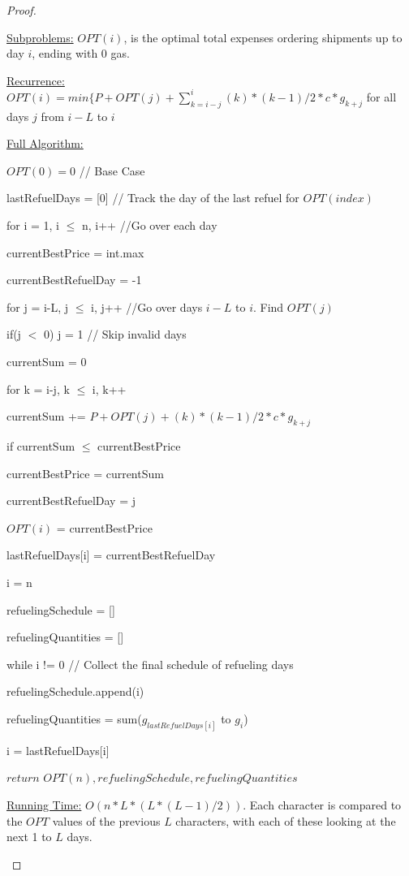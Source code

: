\documentclass[11pt, oneside]{article}   	%
\begin{document}
\begin{proof}
\begin{description}

\underline{Subproblems:} $OPT(i)$, is the optimal total expenses ordering shipments up to day $i$, ending with 0 gas.

\underline{Recurrence:} $OPT(i) = min \{P + OPT(j) + \sum_{k=i-j}^{i}(k)*(k-1)/2*c*g_{k+j}$ for all days $j$ from $i-L$ to $i$


\underline{Full Algorithm:}

$OPT(0) = 0$    \quad // Base Case

lastRefuelDays = [0]  \quad // Track the day of the last refuel for $OPT(index)$

for i = 1, i $\leq$ n, i++  \quad //Go over each day

	\quad currentBestPrice = int.max
	
	\quad currentBestRefuelDay = -1

	\quad for j = i-L, j $\leq$ i, j++  \quad //Go over days $i-L$ to $i$. Find $OPT(j)$

	\quad \quad if(j $<$ 0) j = 1 \quad // Skip invalid days
	
	\quad \quad currentSum = 0
	
	\quad \quad for k = i-j, k $\leq$ i, k++

	\quad \quad \quad currentSum += $P + OPT(j) + (k)*(k-1)/2*c*g_{k+j}$
	
	\quad \quad if currentSum $\leq$ currentBestPrice

	\quad \quad \quad currentBestPrice = currentSum

	\quad \quad \quad currentBestRefuelDay = j

	\quad $OPT(i)$ = currentBestPrice

	\quad lastRefuelDays[i] = currentBestRefuelDay

i = n

refuelingSchedule = []

refuelingQuantities = []

while i != 0  \quad // Collect the final schedule of refueling days

\quad refuelingSchedule.append(i)

\quad refuelingQuantities = sum($g_{lastRefuelDays[i]}$ to $g_{i}$)

\quad i = lastRefuelDays[i]

$return$ $OPT(n), refuelingSchedule, refuelingQuantities$

\underline{Running Time:} $O(n*L*(L*(L-1)/2))$. Each character is compared to the $OPT$ values of the previous $L$ characters, with each of these looking at the next 1 to $L$ days.

\end{description}
\end{proof}
\end{document}
